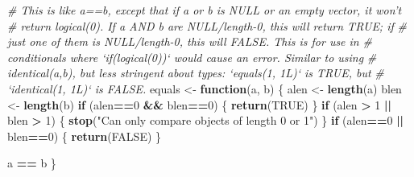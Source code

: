 \documentclass[
]{book}
\newenvironment{Shaded}{\begin{snugshade}}{\end{snugshade}}
\newcommand{\CommentTok}[1]{\textcolor[rgb]{0.56,0.35,0.01}{\textit{#1}}}
\newcommand{\ControlFlowTok}[1]{\textcolor[rgb]{0.13,0.29,0.53}{\textbf{#1}}}
\newcommand{\DecValTok}[1]{\textcolor[rgb]{0.00,0.00,0.81}{#1}}
\newcommand{\KeywordTok}[1]{\textcolor[rgb]{0.13,0.29,0.53}{\textbf{#1}}}
\newcommand{\NormalTok}[1]{#1}
\newcommand{\OperatorTok}[1]{\textcolor[rgb]{0.81,0.36,0.00}{\textbf{#1}}}
\newcommand{\OtherTok}[1]{\textcolor[rgb]{0.56,0.35,0.01}{#1}}
\newcommand{\StringTok}[1]{\textcolor[rgb]{0.31,0.60,0.02}{#1}}
\begin{document}
\begin{Shaded}
\begin{Highlighting}[]
\CommentTok{# This is like a==b, except that if a or b is NULL or an empty vector, it won't}
\CommentTok{# return logical(0). If a AND b are NULL/length-0, this will return TRUE; if}
\CommentTok{# just one of them is NULL/length-0, this will FALSE. This is for use in}
\CommentTok{# conditionals where `if(logical(0))` would cause an error. Similar to using}
\CommentTok{# identical(a,b), but less stringent about types: `equals(1, 1L)` is TRUE, but}
\CommentTok{# `identical(1, 1L)` is FALSE.}
\NormalTok{equals <-}\StringTok{ }\ControlFlowTok{function}\NormalTok{(a, b) \{}
\NormalTok{  alen <-}\StringTok{ }\KeywordTok{length}\NormalTok{(a)}
\NormalTok{  blen <-}\StringTok{ }\KeywordTok{length}\NormalTok{(b)}
  \ControlFlowTok{if}\NormalTok{ (alen}\OperatorTok{==}\DecValTok{0} \OperatorTok{&&}\StringTok{ }\NormalTok{blen}\OperatorTok{==}\DecValTok{0}\NormalTok{) \{}
    \KeywordTok{return}\NormalTok{(}\OtherTok{TRUE}\NormalTok{)}
\NormalTok{  \}}
  \ControlFlowTok{if}\NormalTok{ (alen }\OperatorTok{>}\StringTok{ }\DecValTok{1} \OperatorTok{||}\StringTok{ }\NormalTok{blen }\OperatorTok{>}\StringTok{ }\DecValTok{1}\NormalTok{) \{}
    \KeywordTok{stop}\NormalTok{(}\StringTok{"Can only compare objects of length 0 or 1"}\NormalTok{)}
\NormalTok{  \}}
  \ControlFlowTok{if}\NormalTok{ (alen}\OperatorTok{==}\DecValTok{0} \OperatorTok{||}\StringTok{ }\NormalTok{blen}\OperatorTok{==}\DecValTok{0}\NormalTok{) \{}
    \KeywordTok{return}\NormalTok{(}\OtherTok{FALSE}\NormalTok{)}
\NormalTok{  \}}

\NormalTok{  a }\OperatorTok{==}\StringTok{ }\NormalTok{b}
\NormalTok{\}}



\end{Highlighting}
\end{Shaded}
\end{document}
